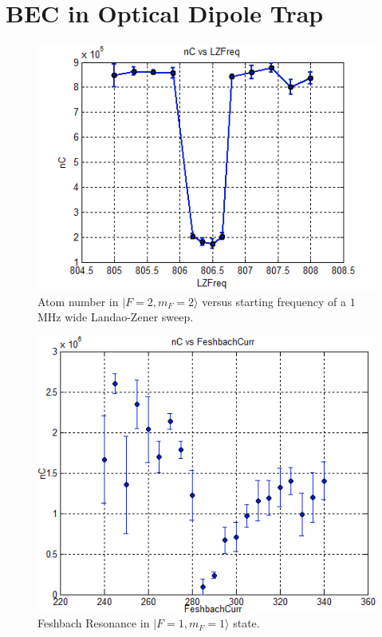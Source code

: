 \section{BEC in Optical Dipole Trap}\label{exp:odt}
\begin{figure}
  \begin{center}
    \includegraphics[width=12cm]{landao-zener.png}
  \end{center}
  \caption{Atom number in $|F=2, m_F=2\rangle$ versus starting frequency of a $1$MHz wide Landao-Zener sweep.}
  \label{exp:landao-zener}
\end{figure}
\begin{figure}
  \begin{center}
    \includegraphics[width=12cm]{feshbach.png}
  \end{center}
  \caption{Feshbach Resonance in $|F=1, m_F=1\rangle$ state.}
  \label{exp:feshbach}
\end{figure}
